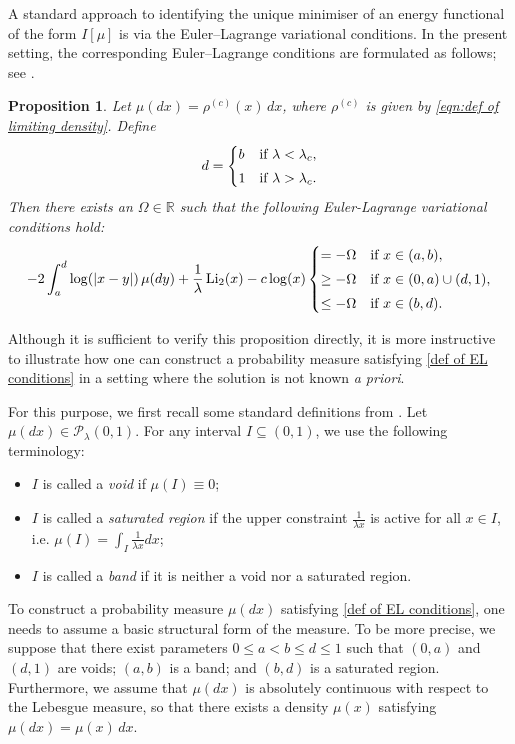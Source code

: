 \documentclass{amsart}
\def\R{\mathbb{R}}
\newcommand{\Li}{\operatorname{Li}}
\theoremstyle{plain}
\newtheorem{prop}[thm]{Proposition}
\theoremstyle{remark}
\numberwithin{equation}{section}
\begin{document}
 
 
A standard approach to identifying the unique minimiser of an energy
functional of the form $I[\mu]$ is via the Euler--Lagrange variational
conditions. In the present setting, the corresponding Euler--Lagrange conditions are formulated as follows;
see \cite[Section~2.1.4]{BKMM}.  
 

\begin{prop} \label{Prop_EL conditions}
Let $\mu(dx)=\rho^{(c)}(x)\,dx$, where $\rho^{(c)}$ is given by \eqref{eqn:def of limiting density}. Define  
\begin{equation} \label{def of parameter d}
d= \begin{cases}
b &\textup{if } \lambda < \lambda_c,
\smallskip 
\\
1 &\textup{if } \lambda > \lambda_c. 
\end{cases}
\end{equation}
Then there exists an $\Omega \in \R$ such that the following Euler-Lagrange variational conditions hold: 
\begin{equation} \label{def of EL conditions}
 -2 \int_a^d \log(|x-y|)\, \mu(dy) + \frac{1}{\lambda}\Li_2(x) -c\log(x) 
 \begin{cases}
    = -\Omega &\textup{if } x \in (a,b),
    \smallskip 
    \\
    \ge -\Omega  &\textup{if } x\in(0,a)\cup(d,1), 
    \smallskip 
    \\
    \le -\Omega  &\textup{if }  x\in(b,d).
 \end{cases}
\end{equation}
\end{prop}

Although it is sufficient to verify this proposition directly, it is more
instructive to illustrate how one can construct a probability measure
satisfying \eqref{def of EL conditions} in a setting where the solution is not known \emph{a priori}. 

For this purpose, we first recall some standard definitions from \cite{BKMM}.
Let $\mu(dx)\in \mathcal{P}_{\lambda}(0,1)$. For any interval
$I \subseteq(0,1)$, we use the following terminology: 
\begin{itemize}
    \item $I$ is called a \textit{void} if $\mu(I)\equiv 0$;
\smallskip
    \item $I$ is called a \textit{saturated region} if the upper constraint $\frac{1}{\lambda x}$ is active for all $x\in I$, i.e. $\mu(I)=\int_I\frac{1}{\lambda x}dx$; 
\smallskip 
    \item $I$ is called a \textit{band} if it is neither a void nor a saturated region. 
\end{itemize}
To construct a probability measure $\mu(dx)$ satisfying
\eqref{def of EL conditions}, one needs to assume a basic structural form of the measure. To be more precise, we suppose that there exist parameters
$0 \le a<b \le d\leq 1$ such that $(0,a)$ and $(d,1)$ are voids; $(a,b)$ is a band; and  $(b,d)$ is a saturated region. 
Furthermore, we assume that $\mu(dx)$ is absolutely continuous with respect
to the Lebesgue measure, so that there exists a density $\mu(x)$ satisfying
$\mu(dx)=\mu(x)\,dx$. 
\end{document}

